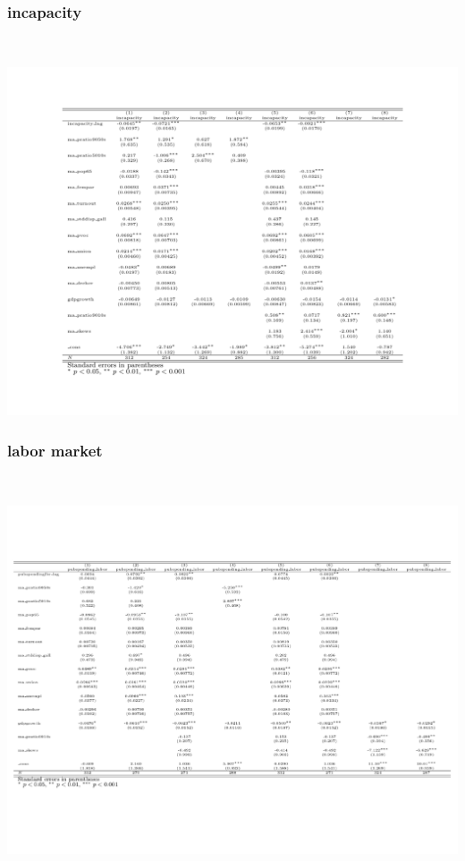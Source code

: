 \documentclass{beamer}
\begin{document}
\begin{frame}
\frametitle{incapacity}\
\begin{center}
\includegraphics[scale=0.35]{incapacity}
\end{center}
\end{frame}

\begin{frame}
\frametitle{labor market}\
\begin{center}
\includegraphics[scale=0.35]{exp}
\end{center}
\end{frame}
\end{document}
